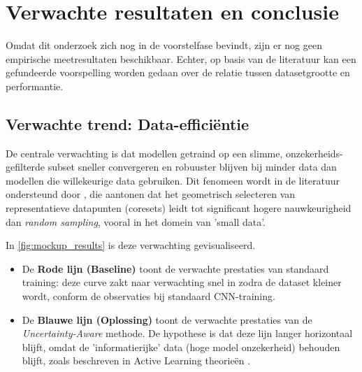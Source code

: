 \begin{center}
\end{center}






\section{Verwachte resultaten en conclusie}%
\label{sec:verwachte_resultaten}

Omdat dit onderzoek zich nog in de voorstelfase bevindt, zijn er nog geen empirische meetresultaten beschikbaar. Echter, op basis van de literatuur kan een gefundeerde voorspelling worden gedaan over de relatie tussen datasetgrootte en performantie.

\subsection{Verwachte trend: Data-efficiëntie}
De centrale verwachting is dat modellen getraind op een slimme, onzekerheids-gefilterde subset sneller convergeren en robuuster blijven bij minder data dan modellen die willekeurige data gebruiken. Dit fenomeen wordt in de literatuur ondersteund door \textcite{sener2017active}, die aantonen dat het geometrisch selecteren van representatieve datapunten (coresets) leidt tot significant hogere nauwkeurigheid dan \textit{random sampling}, vooral in het domein van 'small data'.

In \autoref{fig:mockup_results} is deze verwachting gevisualiseerd.
\begin{itemize}
    \item De \textbf{Rode lijn (Baseline)} toont de verwachte prestaties van standaard training: deze curve zakt naar verwachting snel in zodra de dataset kleiner wordt, conform de observaties bij standaard CNN-training.
    \item De \textbf{Blauwe lijn (Oplossing)} toont de verwachte prestaties van de \textit{Uncertainty-Aware} methode. De hypothese is dat deze lijn langer horizontaal blijft, omdat de 'informatierijke' data (hoge model onzekerheid) behouden blijft, zoals beschreven in Active Learning theorieën \autocite{settles2009active}.
\end{itemize}

